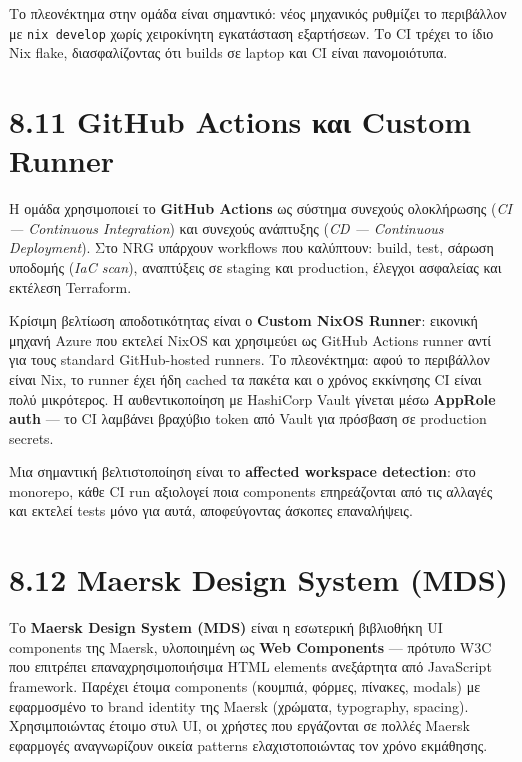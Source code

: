 Το πλεονέκτημα στην ομάδα είναι σημαντικό: νέος μηχανικός ρυθμίζει το
περιβάλλον με \texttt{nix\ develop} χωρίς χειροκίνητη εγκατάσταση
εξαρτήσεων. Το CI τρέχει το ίδιο Nix flake, διασφαλίζοντας ότι builds σε
laptop και CI είναι πανομοιότυπα.

\section{8.11 GitHub Actions και Custom
Runner}\label{github-actions-ux3baux3b1ux3b9-custom-runner}

Η ομάδα χρησιμοποιεί το \textbf{GitHub Actions} ως σύστημα συνεχούς
ολοκλήρωσης (\emph{CI --- Continuous Integration}) και συνεχούς
ανάπτυξης (\emph{CD --- Continuous Deployment}). Στο NRG υπάρχουν
workflows που καλύπτουν: build, test, σάρωση υποδομής (\emph{IaC scan}),
αναπτύξεις σε staging και production, έλεγχοι ασφαλείας και εκτέλεση
Terraform.

Κρίσιμη βελτίωση αποδοτικότητας είναι ο \textbf{Custom NixOS Runner}:
εικονική μηχανή Azure που εκτελεί NixOS και χρησιμεύει ως GitHub Actions
runner αντί για τους standard GitHub-hosted runners. Το πλεονέκτημα:
αφού το περιβάλλον είναι Nix, το runner έχει ήδη cached τα πακέτα και ο
χρόνος εκκίνησης CI είναι πολύ μικρότερος. Η αυθεντικοποίηση με
HashiCorp Vault γίνεται μέσω \textbf{AppRole auth} --- το CI λαμβάνει
βραχύβιο token από Vault για πρόσβαση σε production secrets.

Μια σημαντική βελτιστοποίηση είναι το \textbf{affected workspace
detection}: στο monorepo, κάθε CI run αξιολογεί ποια components
επηρεάζονται από τις αλλαγές και εκτελεί tests μόνο για αυτά,
αποφεύγοντας άσκοπες επαναλήψεις.

\section{8.12 Maersk Design System
(MDS)}\label{maersk-design-system-mds}

Το \textbf{Maersk Design System (MDS)} είναι η εσωτερική βιβλιοθήκη UI
components της Maersk, υλοποιημένη ως \textbf{Web Components} ---
πρότυπο W3C που επιτρέπει επαναχρησιμοποιήσιμα HTML elements ανεξάρτητα
από JavaScript framework. Παρέχει έτοιμα components (κουμπιά, φόρμες,
πίνακες, modals) με εφαρμοσμένο το brand identity της Maersk (χρώματα,
typography, spacing). Χρησιμποιώντας έτοιμο στυλ UI, οι χρήστες που
εργάζονται σε πολλές Maersk εφαρμογές αναγνωρίζουν οικεία patterns
ελαχιστοποιώντας τον χρόνο εκμάθησης.


